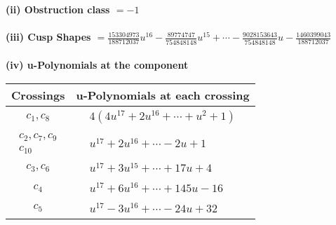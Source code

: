 \documentclass[1p]{elsarticle_modified}
\theoremstyle{definition}
\begin{document}
\flushleft \textbf{(ii) Obstruction class $= -1$}\\~\\
\flushleft \textbf{(iii) Cusp Shapes $= \frac{153304973}{188712037} u^{16}-\frac{89774747}{754848148} u^{15}+\cdots-\frac{9028153643}{754848148} u-\frac{1460399043}{188712037}$}\\~\\
\newpage\renewcommand{\arraystretch}{1}
\flushleft \textbf{(iv) u-Polynomials at the component}\newline \\
\begin{tabular}{m{50pt}|m{274pt}}
Crossings & \hspace{64pt}u-Polynomials at each crossing \\
\hline $$\begin{aligned}c_{1},c_{8}\end{aligned}$$&$\begin{aligned}
&4(4 u^{17}+2 u^{16}+\cdots+u^2+1)
\end{aligned}$\\
\hline $$\begin{aligned}c_{2},c_{7},c_{9}\\c_{10}\end{aligned}$$&$\begin{aligned}
&u^{17}+2 u^{16}+\cdots-2 u+1
\end{aligned}$\\
\hline $$\begin{aligned}c_{3},c_{6}\end{aligned}$$&$\begin{aligned}
&u^{17}+3 u^{15}+\cdots+17 u+4
\end{aligned}$\\
\hline $$\begin{aligned}c_{4}\end{aligned}$$&$\begin{aligned}
&u^{17}+6 u^{16}+\cdots+145 u-16
\end{aligned}$\\
\hline $$\begin{aligned}c_{5}\end{aligned}$$&$\begin{aligned}
&u^{17}-3 u^{16}+\cdots-24 u+32
\end{aligned}$\\
\hline
\end{tabular}\\~\\
\newpage\renewcommand{\arraystretch}{1}
\end{document}
